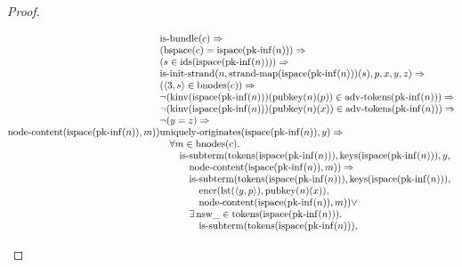 \documentclass[11pt]{article}
\theoremstyle{plain}
\begin{document}
\begin{proof}
\begin{itemize}[leftmargin=2.8em, itemsep=4pt, parsep=1pt]
\begin{itemize}[leftmargin=2.8em, itemsep=4pt, parsep=1pt]
\begin{equation*}
\begin{array}{@{}l@{}}
\operatorname{node\text{-}content}(\operatorname{ispace}(\operatorname{pk\text{-}inf}(n)), m)) \end{array} \\
\begin{array}{@{}l@{}} \operatorname{is\text{-}bundle}(c) \Rightarrow  \\ (\operatorname{bspace}(c) = \operatorname{ispace}(\operatorname{pk\text{-}inf}(n))) \Rightarrow  \\ (s \in \operatorname{ids}(\operatorname{ispace}(\operatorname{pk\text{-}inf}(n)))) \Rightarrow  \\ \operatorname{is\text{-}init\text{-}strand}(n, \operatorname{strand\text{-}map}(\operatorname{ispace}(\operatorname{pk\text{-}inf}(n)))(s), p, x, y, z) \Rightarrow  \\ (\langle 3, s \rangle \in \operatorname{bnodes}(c)) \Rightarrow  \\ \neg (\operatorname{kinv}(\operatorname{ispace}(\operatorname{pk\text{-}inf}(n)))(\operatorname{pubkey}(n)(p)) \in \operatorname{adv\text{-}tokens}(\operatorname{pk\text{-}inf}(n))) \Rightarrow  \\ \neg (\operatorname{kinv}(\operatorname{ispace}(\operatorname{pk\text{-}inf}(n)))(\operatorname{pubkey}(n)(x)) \in \operatorname{adv\text{-}tokens}(\operatorname{pk\text{-}inf}(n))) \Rightarrow  \\ \neg (y = z) \Rightarrow  \\ \operatorname{uniquely\text{-}originates}(\operatorname{ispace}(\operatorname{pk\text{-}inf}(n)), y) \Rightarrow  \\ \quad \forall m \in \operatorname{bnodes}(c). \\ \quad \quad \operatorname{is\text{-}subterm}(\operatorname{tokens}(\operatorname{ispace}(\operatorname{pk\text{-}inf}(n))), \operatorname{keys}(\operatorname{ispace}(\operatorname{pk\text{-}inf}(n))), y, \\ \quad \quad \quad \operatorname{node\text{-}content}(\operatorname{ispace}(\operatorname{pk\text{-}inf}(n)), m)) \Rightarrow \\ \quad \quad \quad \operatorname{is\text{-}subterm}(\operatorname{tokens}(\operatorname{ispace}(\operatorname{pk\text{-}inf}(n))), \operatorname{keys}(\operatorname{ispace}(\operatorname{pk\text{-}inf}(n))), \\ \quad \quad \quad \quad \operatorname{encr}(\operatorname{lst}(\langle y, p \rangle), \operatorname{pubkey}(n)(x)), \\ \quad \quad \quad \quad \operatorname{node\text{-}content}(\operatorname{ispace}(\operatorname{pk\text{-}inf}(n)), m)) \vee \\ \quad \quad \quad \exists \operatorname{nsw\_} \in \operatorname{tokens}(\operatorname{ispace}(\operatorname{pk\text{-}inf}(n))). \\ \quad \quad \quad \quad \operatorname{is\text{-}subterm}(\operatorname{tokens}(\operatorname{ispace}(\operatorname{pk\text{-}inf}(n))), 
\end{array}
\end{equation*}
\end{itemize}
\end{itemize}
\end{proof}
\end{document}
